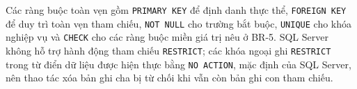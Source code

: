 Các ràng buộc toàn vẹn gồm \texttt{PRIMARY KEY} để định danh thực thể, \texttt{FOREIGN KEY} để duy trì toàn vẹn tham chiếu, \texttt{NOT NULL} cho trường bắt buộc, \texttt{UNIQUE} cho khóa nghiệp vụ và \texttt{CHECK} cho các ràng buộc miền giá trị nêu ở BR-5. SQL Server không hỗ trợ hành động tham chiếu \texttt{RESTRICT}; các khóa ngoại ghi \texttt{RESTRICT} trong từ điển dữ liệu được hiện thực bằng \texttt{NO ACTION}, mặc định của SQL Server, nên thao tác xóa bản ghi cha bị từ chối khi vẫn còn bản ghi con tham chiếu.

